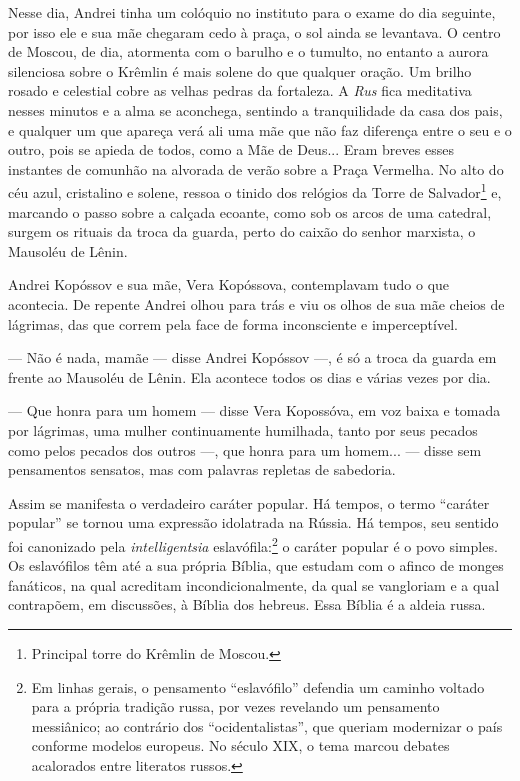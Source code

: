 Nesse dia, Andrei tinha um colóquio no instituto para o exame do dia
seguinte, por isso ele e sua mãe chegaram cedo à praça, o sol ainda se
levantava. O centro de Moscou, de dia, atormenta com o barulho e o
tumulto, no entanto a aurora silenciosa sobre o Krêmlin é mais solene do
que qualquer oração. Um brilho rosado e celestial cobre as velhas pedras
da fortaleza. A \emph{Rus} fica meditativa nesses minutos e a alma se
aconchega, sentindo a tranquilidade da casa dos pais, e qualquer um que
apareça verá ali uma mãe que não faz diferença entre o seu e o outro,
pois se apieda de todos, como a Mãe de Deus... Eram breves esses
instantes de comunhão na alvorada de verão sobre a Praça Vermelha. No
alto do céu azul, cristalino e solene, ressoa o tinido dos relógios da
Torre de Salvador\footnote{Principal torre do Krêmlin de Moscou.} e,
marcando o passo sobre a calçada ecoante, como sob os arcos de uma
catedral, surgem os rituais da troca da guarda, perto do caixão do
senhor marxista, o Mausoléu de Lênin.

Andrei Kopóssov e sua mãe, Vera Kopóssova, contemplavam tudo o que
acontecia. De repente Andrei olhou para trás e viu os olhos de sua mãe
cheios de lágrimas, das que correm pela face de forma inconsciente e
imperceptível.

--- Não é nada, mamãe --- disse Andrei Kopóssov ---, é só a troca da
guarda em frente ao Mausoléu de Lênin. Ela acontece todos os dias e
várias vezes por dia.

--- Que honra para um homem --- disse Vera Kopossóva, em voz baixa e
tomada por lágrimas, uma mulher continuamente humilhada, tanto por seus
pecados como pelos pecados dos outros ---, que honra para um homem...
--- disse sem pensamentos sensatos, mas com palavras repletas de
sabedoria.

Assim se manifesta o verdadeiro caráter popular. Há tempos, o termo
``caráter popular'' se tornou uma expressão idolatrada na Rússia. Há
tempos, seu sentido foi canonizado pela \emph{intelligentsia}
eslavófila:\footnote{Em linhas gerais, o pensamento ``eslavófilo''
  defendia um caminho voltado para a própria tradição russa, por vezes
  revelando um pensamento messiânico; ao contrário dos
  ``ocidentalistas'', que queriam modernizar o país conforme modelos
  europeus. No século XIX, o tema marcou debates acalorados entre
  literatos russos.} o caráter popular é o povo simples. Os eslavófilos
têm até a sua própria Bíblia, que estudam com o afinco de monges
fanáticos, na qual acreditam incondicionalmente, da qual se vangloriam e
a qual contrapõem, em discussões, à Bíblia dos hebreus. Essa Bíblia é a
aldeia russa.


